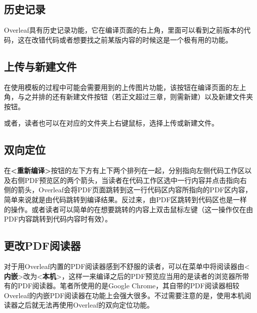 \subsection{历史记录}

Overleaf具有历史记录功能，它在编译页面的右上角，里面可以看到之前版本的代码，这在改错代码或者想要找之前某版内容的时候这是一个极有用的功能。

\subsection{上传与新建文件}

在使用模板的过程中可能会需要用到的上传图片功能，该按钮在编译页面的左上角，与之并排的还有新建文件按钮（若正文超过三章，则需新建）以及新建文件夹按钮。

或者，读者也可以在对应的文件夹上右键鼠标，选择上传或新建文件。

\subsection{双向定位}

在\textbf{<重新编译>}按钮的左下方有上下两个排列在一起，分别指向左侧代码工作区以及右侧PDF预览区的两个箭头，当读者在代码工作区选中一行内容并点击指向右侧的箭头，Overleaf会将PDF页面跳转到这一行代码区内容所指向的PDF区内容，简单来说就是由代码跳转到编译结果。反过来，由PDF区跳转到代码区也是一样的操作。或者读者可以简单的在想要跳转的内容上双击鼠标左键（这一操作仅在由PDF内容跳转到代码内容时有效）。

\subsection{更改PDF阅读器}

对于用Overleaf内置的PDF阅读器感到不舒服的读者，可以在菜单中将阅读器由<\textbf{内嵌}>改为<\textbf{本机}>，这样一来编译之后的PDF预览应当用的是读者的浏览器所带有的PDF阅读器。笔者所使用的是Google Chrome，其自带的PDF阅读器相较Overleaf的内嵌PDF阅读器在功能上会强大很多。不过需要注意的是，使用本机阅读器之后就无法再使用Overleaf的双向定位功能。

